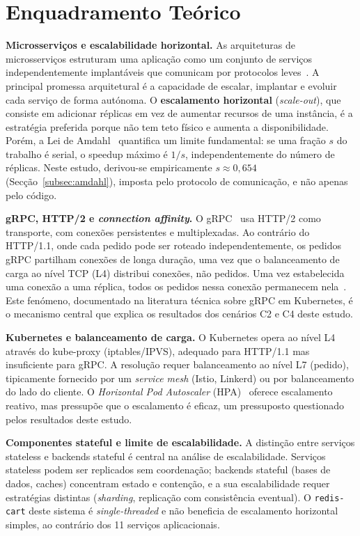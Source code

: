 \documentclass[manuscript,screen,review]{acmart}
\begin{document}
\section{Enquadramento Teórico}
\label{sec:teoria}

\textbf{Microsserviços e escalabilidade horizontal.} As arquiteturas de microsserviços estruturam uma aplicação como um conjunto de serviços independentemente implantáveis que comunicam por protocolos leves~\cite{fowler,newman}. A principal promessa arquitetural é a capacidade de escalar, implantar e evoluir cada serviço de forma autónoma. O \textbf{escalamento horizontal} (\textit{scale-out}), que consiste em adicionar réplicas em vez de aumentar recursos de uma instância, é a estratégia preferida porque não tem teto físico e aumenta a disponibilidade. Porém, a Lei de Amdahl~\cite{amdahl} quantifica um limite fundamental: se uma fração $s$ do trabalho é serial, o speedup máximo é $1/s$, independentemente do número de réplicas. Neste estudo, derivou-se empiricamente $s \approx 0{,}654$ (Secção~\ref{subsec:amdahl}), imposta pelo protocolo de comunicação, e não apenas pelo código.

\textbf{gRPC, HTTP/2 e \textit{connection affinity}.} O gRPC~\cite{grpc} usa HTTP/2 como transporte, com conexões persistentes e multiplexadas. Ao contrário do HTTP/1.1, onde cada pedido pode ser roteado independentemente, os pedidos gRPC partilham conexões de longa duração, uma vez que o balanceamento de carga ao nível TCP (L4) distribui conexões, não pedidos. Uma vez estabelecida uma conexão a uma réplica, todos os pedidos nessa conexão permanecem nela~\cite{grpcloadbalancing,k8sgrpc}. Este fenómeno, documentado na literatura técnica sobre gRPC em Kubernetes, é o mecanismo central que explica os resultados dos cenários C2 e C4 deste estudo.

\textbf{Kubernetes e balanceamento de carga.} O Kubernetes opera ao nível L4 através do kube-proxy (iptables/IPVS), adequado para HTTP/1.1 mas insuficiente para gRPC. A resolução requer balanceamento ao nível L7 (pedido), tipicamente fornecido por um \textit{service mesh} (Istio, Linkerd) ou por balanceamento do lado do cliente. O \textit{Horizontal Pod Autoscaler} (HPA)~\cite{k8shpa} oferece escalamento reativo, mas pressupõe que o escalamento é eficaz, um pressuposto questionado pelos resultados deste estudo.

\textbf{Componentes stateful e limite de escalabilidade.} A distinção entre serviços stateless e backends stateful é central na análise de escalabilidade. Serviços stateless podem ser replicados sem coordenação; backends stateful (bases de dados, caches) concentram estado e contenção, e a sua escalabilidade requer estratégias distintas (\textit{sharding}, replicação com consistência eventual). O \texttt{redis-cart} deste sistema é \textit{single-threaded} e não beneficia de escalamento horizontal simples, ao contrário dos 11 serviços aplicacionais.
\end{document}
